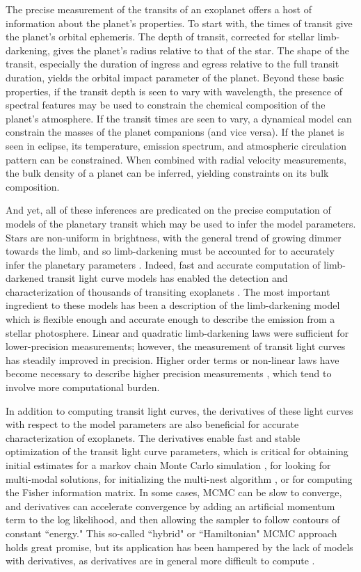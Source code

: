 \documentclass[modern]{aastex61}
\begin{document}
The precise measurement of the transits of an exoplanet offers a host of information
about the planet's properties.  To start with, the times of transit give
the planet's orbital ephemeris.  The depth of transit, corrected for stellar
limb-darkening, gives the planet's radius relative to that of the star.   The
shape of the transit, especially the duration of ingress and egress relative to
the full transit duration, yields the orbital impact parameter of the planet.
Beyond these basic properties, if the transit depth is seen to vary with wavelength,
the presence of spectral features may be used to constrain the chemical composition
of the planet's atmosphere.  If the transit times are seen to vary, a dynamical
model can constrain the masses of the planet companions (and vice versa).  If
the planet is seen in eclipse, its temperature, emission spectrum, and atmospheric
circulation pattern can be constrained.  When combined with radial velocity
measurements, the bulk density of a planet can be inferred, yielding constraints
on its bulk composition.

And yet, all of these inferences are predicated on the precise computation of models
of the planetary transit which may be used to infer the model parameters.  Stars 
are non-uniform in brightness, with the general
trend of growing dimmer towards the limb, and so limb-darkening must be accounted
for to accurately infer the planetary parameters \citep{Csizmadia2018}.  Indeed, fast
and accurate computation of limb-darkened transit light curve models has enabled the
detection and characterization of thousands of transiting exoplanets \citep{MandelAgol2002}.
The most important ingredient to these models has been a description of the
limb-darkening model which is flexible enough and accurate enough to describe the
emission from a stellar photosphere.  Linear and quadratic limb-darkening laws
were sufficient for lower-precision measurements; however, the measurement of
transit light curves has steadily improved in precision.  Higher order terms or non-linear laws
have become necessary to describe higher precision measurements \citep{Claret2000,
Gimenez2006}, which tend to involve more computational burden.

In addition to computing transit light curves, the derivatives of these light
curves with respect to the model parameters are also beneficial for accurate
characterization of exoplanets.   The derivatives enable fast and stable
optimization of the transit light curve parameters, which is critical for
obtaining initial estimates for a markov chain Monte Carlo simulation 
\citep[MCMC; e.g.][]{Ford2005,Ford2006},
for looking for multi-modal solutions, for initializing the multi-nest
algorithm \citep{Feroz2008}, or for computing the Fisher information matrix.
In some cases, MCMC can be slow to converge, and derivatives can accelerate
convergence by adding an artificial momentum term to the log likelihood,
and then allowing the sampler to follow contours of constant ``energy."
This so-called ``hybrid" or ``Hamiltonian" MCMC approach holds great promise,
but its application has been hampered by the lack of models with derivatives,
as derivatives are in general more difficult to compute \citep{Girolami2011,Betancourt2017}.
\end{document}
